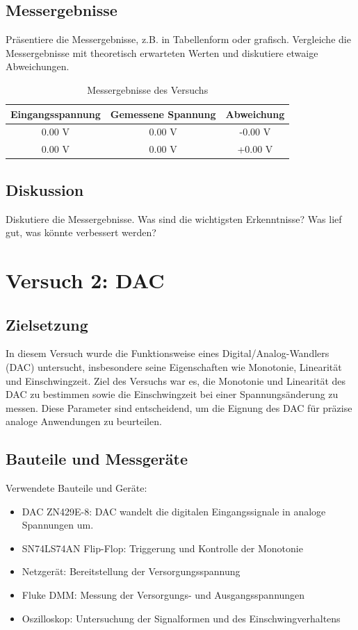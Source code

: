 \documentclass[a4paper,12pt]{article}
\begin{document}
\subsection{Messergebnisse}
Präsentiere die Messergebnisse, z.B. in Tabellenform oder grafisch. Vergleiche die Messergebnisse mit theoretisch erwarteten Werten und diskutiere etwaige Abweichungen.

\begin{table}[H]
    \centering
    \begin{tabular}{|c|c|c|}
        \hline
        Eingangsspannung & Gemessene Spannung & Abweichung \\
        \hline
        0.00 V & 0.00 V & -0.00 V \\
        0.00 V & 0.00 V & +0.00 V \\
        \hline
    \end{tabular}
    \caption{Messergebnisse des Versuchs}
\end{table}

\subsection{Diskussion}
Diskutiere die Messergebnisse. Was sind die wichtigsten Erkenntnisse? Was lief gut, was könnte verbessert werden?

\section{Versuch 2: DAC}

\subsection{Zielsetzung}
In diesem Versuch wurde die Funktionsweise eines Digital/Analog-Wandlers (DAC) untersucht, insbesondere seine Eigenschaften wie Monotonie, Linearität und Einschwingzeit. Ziel des Versuchs war es, die Monotonie und Linearität des DAC zu bestimmen sowie die Einschwingzeit bei einer Spannungsänderung zu messen. Diese Parameter sind entscheidend, um die Eignung des DAC für präzise analoge Anwendungen zu beurteilen.

\subsection{Bauteile und Messgeräte}
Verwendete Bauteile und Geräte:
\begin{itemize}
\item DAC ZN429E-8: DAC wandelt die digitalen Eingangssignale in analoge Spannungen um.
\item SN74LS74AN Flip-Flop: Triggerung und Kontrolle der Monotonie
\item Netzgerät: Bereitstellung der Versorgungsspannung
\item Fluke DMM: Messung der Versorgungs- und Ausgangsspannungen
\item Oszilloskop: Untersuchung der Signalformen und des Einschwingverhaltens
\end{itemize}
\end{document}
